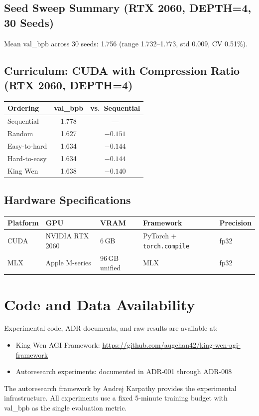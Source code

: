 \documentclass{article}
\begin{document}
\subsection{Seed Sweep Summary (RTX 2060, DEPTH=4, 30 Seeds)}

Mean val\_bpb across 30 seeds: 1.756 (range 1.732--1.773, std 0.009, CV 0.51\%).

\subsection{Curriculum: CUDA with Compression Ratio (RTX 2060, DEPTH=4)}

\begin{table}[h]
\centering
\begin{tabular}{lcc}
\toprule
\textbf{Ordering} & \textbf{val\_bpb} & \textbf{vs.\ Sequential} \\
\midrule
Sequential & 1.778 & --- \\
Random & 1.627 & $-0.151$ \\
Easy-to-hard & 1.634 & $-0.144$ \\
Hard-to-easy & 1.634 & $-0.144$ \\
King Wen & 1.638 & $-0.140$ \\
\bottomrule
\end{tabular}
\end{table}

\subsection{Hardware Specifications}

\begin{table}[h]
\centering
\begin{tabular}{lllll}
\toprule
\textbf{Platform} & \textbf{GPU} & \textbf{VRAM} & \textbf{Framework} & \textbf{Precision} \\
\midrule
CUDA & NVIDIA RTX 2060 & 6\,GB & PyTorch + \texttt{torch.compile} & fp32 \\
MLX & Apple M-series & 96\,GB unified & MLX & fp32 \\
\bottomrule
\end{tabular}
\end{table}

\section{Code and Data Availability}\label{app:code}

Experimental code, ADR documents, and raw results are available at:

\begin{itemize}
\tightlist
\item King Wen AGI Framework: \url{https://github.com/augchan42/king-wen-agi-framework}
\item Autoresearch experiments: documented in ADR-001 through ADR-008
\end{itemize}

The autoresearch framework by Andrej Karpathy provides the experimental infrastructure. All experiments use a fixed 5-minute training budget with val\_bpb as the single evaluation metric.
\end{document}
